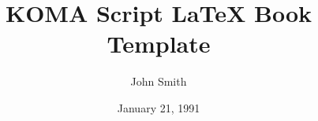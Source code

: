 \documentclass[a4paper,11pt]{scrbook}
\begin{document}
\title{\textbf{KOMA Script LaTeX Book Template}}
\author{John Smith}
\date{January 21, 1991}


\maketitle






\tableofcontents








\nocite{*}


\end{document}
